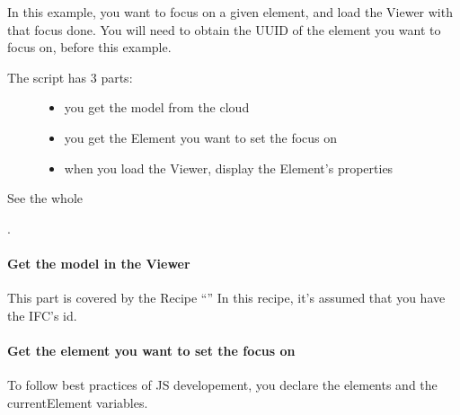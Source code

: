\documentclass[a4paper,12pt,english]{sphinxmanual}
\begin{document}
In this example, you want to focus on a given element, and load the Viewer with that focus done.
You will need to obtain the UUID of the element you want to focus on, before this example.
\begin{description}
\item[{The script has 3 parts:}] \leavevmode\begin{itemize}
\item {} 
you get the model from the cloud

\item {} 
you get the Element you want to set the focus on

\item {} 
when you load the Viewer, display the Element’s properties

\end{itemize}

\end{description}

See the whole %
\begin{footnote}[17]\sphinxAtStartFootnote
{}
%
\end{footnote}.


\paragraph{Get the model in the Viewer}
\label{\detokenize{viewer/viewfit_focus:get-the-model-in-the-viewer}}
This part is covered by the Recipe “{\hyperref[\detokenize{viewer/init_viewer::doc}]{}}”
In this recipe, it’s assumed that you have the IFC’s id.


\paragraph{Get the element you want to set the focus on}
\label{\detokenize{viewer/viewfit_focus:get-the-element-you-want-to-set-the-focus-on}}
To follow best practices of JS developement, you declare the elements and the currentElement variables.

%
\begin{sphinxVerbatim}[commandchars=\\\{\}]
   
   
\end{sphinxVerbatim}
\end{document}
